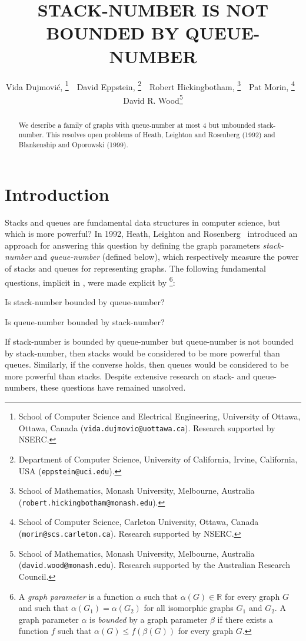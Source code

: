 \documentclass[kpfonts]{patmorin}
\title{\MakeUppercase{Stack-Number is not Bounded by Queue-Number}}
\author{%
	Vida Dujmovi\'c,\!\!%
	\thanks{School of Computer Science and Electrical Engineering,
		University of Ottawa, Ottawa, Canada (\texttt{vida.dujmovic@uottawa.ca}).
		Research supported by NSERC.}
	\,\,
	David Eppstein,\!\!%
	\thanks{Department of Computer Science, University of California, Irvine, California, USA (\texttt{eppstein@uci.edu}).}
	\,\,
	Robert Hickingbotham,\!\!%
	\thanks{School of Mathematics, Monash University, Melbourne, Australia (\texttt{robert.hickingbotham@monash.edu}).}
	\,\,
	Pat Morin,\!\!%
	\thanks{School of Computer Science, Carleton University, Ottawa, Canada (\texttt{morin@scs.carleton.ca}). Research  supported by NSERC.}
	\,\,
	David R. Wood\thanks{School of Mathematics, Monash University, Melbourne, Australia (\texttt{david.wood@monash.edu}). Research supported by the Australian Research Council.}
}
\renewcommand{\leq}{\leqslant}
\begin{document}
\maketitle

\begin{abstract}
We describe a family of graphs with queue-number at most 4 but unbounded stack-number. This resolves open problems of Heath, Leighton and Rosenberg (1992) and Blankenship and Oporowski (1999).
\end{abstract}

\bigskip

\section{Introduction}

Stacks and queues are fundamental data structures in computer science, but which is more powerful? In 1992, Heath, Leighton and Rosenberg~\cite{HLR92,HR92} introduced an approach for answering this question by defining the graph parameters \textit{stack-number} and \textit{queue-number} (defined below), which respectively measure the power of stacks and queues for representing graphs. The following fundamental questions, implicit in \citep{HLR92,HR92}, were made explicit by \citet{DujWoo05}\footnote{A \emph{graph parameter} is a function $\alpha$ such that $\alpha(G)\in\mathbb{R}$ for every graph $G$ and such that $\alpha(G_1)=\alpha(G_2)$ for all isomorphic graphs $G_1$ and $G_2$. A graph parameter $\alpha$ is \textit{bounded} by a graph parameter $\beta$ if there exists a function $f$ such that $\alpha(G) \leq f(\beta(G))$ for every graph $G$.}:
\begin{compactitem}
	\item Is stack-number bounded by queue-number?
	\item Is queue-number bounded by stack-number?
\end{compactitem}

If stack-number is bounded by queue-number but queue-number is not bounded by stack-number, then stacks would be considered to be more powerful than queues. Similarly, if the converse holds, then queues would be considered to be more powerful than stacks. Despite extensive research on stack- and queue-numbers, these questions have remained unsolved.

\end{document}
